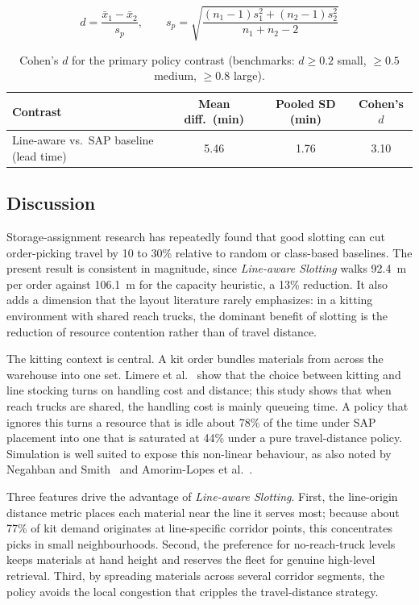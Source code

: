 \documentclass[conference]{IEEEtran}
\newcommand{\policy}[1]{\textit{#1}}
\begin{document}
\begin{equation}
\label{eq:cohen}
d = \frac{\bar{x}_1 - \bar{x}_2}{s_p}, \qquad
s_p = \sqrt{\frac{(n_1-1)s_1^2 + (n_2-1)s_2^2}{n_1+n_2-2}}
\end{equation}

\begin{table}[htbp]
\centering
\caption{Cohen's $d$ for the primary policy contrast (benchmarks: $d\ge0.2$
small, $\ge0.5$ medium, $\ge0.8$ large).}
\label{tab:cohen}
\begin{tabular}{lccc}
\toprule
Contrast & Mean diff.\ (min) & Pooled SD (min) & Cohen's $d$ \\
\midrule
Line-aware vs.\ SAP baseline (lead time) & 5.46 & 1.76 & 3.10 \\
\bottomrule
\end{tabular}
\end{table}

\subsection{Discussion}
\label{sec:res-disc}
Storage-assignment research has repeatedly found that good slotting can cut
order-picking travel by 10 to 30\% relative to random or class-based
baselines. The present result is consistent in magnitude, since
\policy{Line-aware Slotting} walks 92.4~m per order against 106.1~m for the
capacity heuristic, a 13\% reduction. It also adds a dimension that the layout
literature rarely emphasizes: in a kitting environment with shared reach
trucks, the dominant benefit of slotting is the reduction of resource
contention rather than of travel distance.

The kitting context is central. A kit order bundles materials from across the
warehouse into one set. Limere et al.~\cite{limere2012} show that the choice
between kitting and line stocking turns on handling cost and distance; this
study shows that when reach trucks are shared, the handling cost is mainly
queueing time. A policy that ignores this turns a resource that is idle about
78\% of the time under SAP placement into one that is saturated at 44\% under
a pure travel-distance policy. Simulation is well suited to expose this
non-linear behaviour, as also noted by
Negahban and Smith~\cite{negahban2014} and Amorim-Lopes et
al.~\cite{amorim2021}.

Three features drive the advantage of \policy{Line-aware Slotting}. First, the
line-origin distance metric places each material near the line it serves most;
because about 77\% of kit demand originates at line-specific corridor points,
this concentrates picks in small neighbourhoods. Second, the preference for
no-reach-truck levels keeps materials at hand height and reserves the fleet
for genuine high-level retrieval. Third, by spreading materials across several
corridor segments, the policy avoids the local congestion that cripples the
travel-distance strategy.
\end{document}
